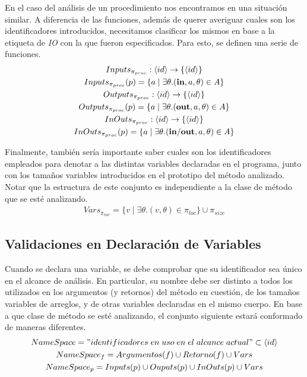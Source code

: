 \documentclass{article}
\begin{document}
En el caso del análisis de un procedimiento nos encontramos en una situación similar.
A diferencia de las funciones, además de querer averiguar cuales son los identificadores introducidos, necesitamos clasificar los mismos en base a la etiqueta de \textit{IO} con la que fueron especificados.
Para esto, se definen una serie de funciones.
\begin{gather*}
Inputs_{\pi_{proc}}: \langle id \rangle \rightarrow \{ \langle id \rangle \}
\\
Inputs_{\pi_{proc}}(p) = \{ a \mid \exists \theta. (\mathbf{in}, a, \theta) \in A \}
\\
Outputs_{\pi_{proc}}: \langle id \rangle \rightarrow \{ \langle id \rangle \}
\\
Outputs_{\pi_{proc}}(p) = \{ a \mid \exists \theta. (\mathbf{out}, a, \theta) \in A \}
\\
InOuts_{\pi_{proc}}: \langle id \rangle \rightarrow \{ \langle id \rangle \}
\\
InOuts_{\pi_{proc}}(p) = \{ a \mid \exists \theta. (\mathbf{in/out}, a, \theta) \in A \}
\end{gather*}

Finalmente, también sería importante saber cuales son los identificadores empleados para denotar a las distintas variables declaradas en el programa, junto con los tamaños variables introducidos en el prototipo del método analizado.
Notar que la estructura de este conjunto es independiente a la clase de método que se esté analizando.
\begin{gather*}
Vars_{\pi_{var}} = \{ v \mid \exists \theta. (v, \theta) \in \pi_{loc} \} \cup \pi_{size}
\end{gather*}

\subsection{Validaciones en Declaración de Variables}

Cuando se declara una variable, se debe comprobar que su identificador sea único en el alcance de análisis.
En particular, su nombre debe ser distinto a todos los utilizados en los argumentos (y retornos) del método en cuestión, de los tamaños variables de arreglos, y de otras variables declaradas en el mismo cuerpo.
En base a que clase de método se esté analizando, el conjunto siguiente estará conformado de maneras diferentes.
\begin{gather*}
NameSpace =
"identificadores \; en \; uso \; en \; el \; alcance \; actual" 
\subset \langle id \rangle
\\
NameSpace_f =
Argumentos(f) \cup Retorno(f) \cup Vars
\\
NameSpace_p =
Inputs(p) \cup Ouputs(p) \cup InOuts(p) \cup Vars
\end{gather*}
\end{document}
